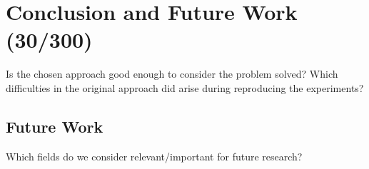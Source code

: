 \section{Conclusion and Future Work (30/300)}

Is the chosen approach good enough to consider the problem solved?
Which difficulties in the original approach did arise during reproducing the experiments?

\subsection{Future Work}

Which fields do we consider relevant/important for future research?
